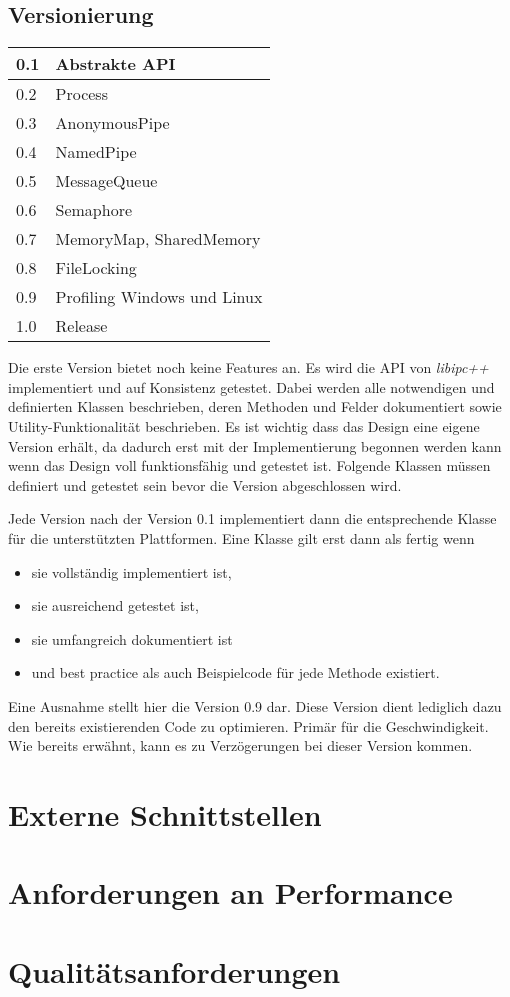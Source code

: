 \documentclass[a4paper]{book}
\begin{document}
\subsection{Versionierung}
\begin{center}
\begin{longtable}{|p{3cm}|p{8cm}|}
\hline
0.1 & Abstrakte API \\
\hline
0.2 & Process \\
\hline
0.3 & AnonymousPipe \\
\hline
0.4 & NamedPipe \\
\hline 
0.5 & MessageQueue \\
\hline
0.6 & Semaphore \\
\hline
0.7 & MemoryMap, SharedMemory \\
\hline
0.8 & FileLocking \\
\hline
0.9 & Profiling Windows und Linux\\
\hline
1.0 & Release \\
\hline
\end{longtable}
\end{center}
Die erste Version bietet noch keine Features an. Es wird die API von \textit{libipc++} implementiert und auf Konsistenz getestet. Dabei werden alle notwendigen und definierten Klassen beschrieben, deren Methoden und Felder dokumentiert sowie Utility-Funktionalität beschrieben. Es ist wichtig dass das Design eine eigene Version erhält, da dadurch erst mit der Implementierung begonnen werden kann wenn das Design voll funktionsfähig und getestet ist. Folgende Klassen müssen definiert und getestet sein bevor die Version abgeschlossen wird.\newline

\noindent Jede Version nach der Version 0.1 implementiert dann die entsprechende Klasse für die unterstützten Plattformen. Eine Klasse gilt erst dann als fertig wenn
\begin{itemize}
\item sie vollständig implementiert ist,
\item sie ausreichend getestet ist,
\item sie umfangreich dokumentiert ist
\item und best practice als auch Beispielcode für jede Methode existiert.
\end{itemize}

\noindent Eine Ausnahme stellt hier die Version 0.9 dar. Diese Version dient lediglich dazu den bereits existierenden Code zu optimieren. Primär für die Geschwindigkeit. Wie bereits erwähnt, kann es zu Verzögerungen bei dieser Version kommen.

\section{Externe Schnittstellen}
\blindtext

\section{Anforderungen an Performance}
\blindtext

\section{Qualitätsanforderungen}
\blindtext
\end{document}
